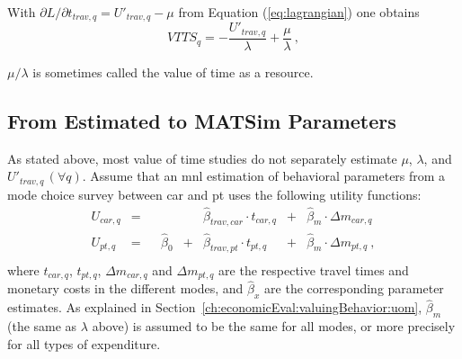 With $\partial L / \partial t_{trav,q} = U'_{trav,q} - \mu$ from Equation (\ref{eq:lagrangian}) one obtains
\begin{equation}
VTTS_q 
= - \frac{U'_{trav,q}}{\lambda} + \frac{\mu}{\lambda} \ ,
\label{eq:vot2}
\end{equation}

$\mu/\lambda$ is sometimes called the value of time as a resource.




\subsection{From Estimated to MATSim Parameters}
\label{ch:economicEval:valuingBehavior:estimates2Matsim}

As stated above, most value of time studies do not separately estimate $\mu$, $\lambda$, and $U'_{trav,q} \, (\forall q)$. 
%
Assume that an \gls{mnl} estimation of behavioral parameters from a mode choice survey between car and \gls{pt} uses the following utility functions:
%
\begin{equation}
\begin{matrix}
U_{car,q} & =
&   &
&   & \hat{\beta}_{trav,car} \cdot t_{car,q}
& + & \hat{\beta}_{m} \cdot  \Delta{m_{car,q}} \\
%
U_{pt,q} & = 
&   & \hat{\beta}_{0}
& + & \hat{\beta}_{trav,pt} \cdot t_{pt,q}
& + & \hat{\beta}_{m} \cdot  \Delta{m_{pt,q}}  \ , \\
\end{matrix}
\label{eq:ch:economicEval:utilityTraveling}
\end{equation}
%
where $t_{car,q}$, $t_{pt,q}$, $\Delta{m_{car,q}}$ and $\Delta{m_{pt,q}}$  are the respective travel times and monetary costs in the different modes, and $\hat\beta_x$ are the corresponding parameter estimates.
%
As explained in Section~\ref{ch:economicEval:valuingBehavior:uom}, $\hat\beta_m$ (the same as $\lambda$ above) is assumed to be the same for all modes, or more precisely for all types of expenditure.

